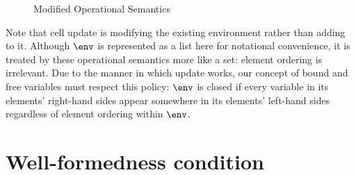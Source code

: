 \documentclass[nocopyright]{sigplanconf}
\begin{document}
\begin{figure}
\begin{mathpar}

    \end{mathpar}
    \caption{Modified Operational Semantics}
    \label{fig_operationalSemanticsModified}
\end{figure}

Note that cell update is modifying the existing environment rather than adding to it.  Although $\env$ is represented as a list here for notational convenience, it is treated by these operational semantics more like a set: element ordering is irrelevant.  Due to the manner in which update works, our concept of bound and free variables must respect this policy: $\env$ is closed if every variable in its elements' right-hand sides appear somewhere in its elements' left-hand sides regardless of element ordering within $\env$.


\section{Well-formedness condition}
\label{sec_wellformedness}
\end{document}

